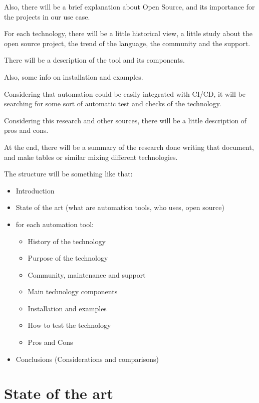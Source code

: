 \documentclass[12pt,a4paper,openright,twoside]{book}
\begin{document}
Also, there will be a brief explanation about Open Source, and its importance for the projects in our use case.


For each technology, there will be a little historical view, a little study about the open source project, the trend of the language, the community and the support.


There will be a description of the tool and its components.


Also, some info on installation and examples.


Considering that automation could be easily integrated with CI/CD, it will be searching for some sort of automatic test and checks of the technology.


Considering this research and other sources, there will be a little description of pros and cons.


At the end, there will be a summary of the research done writing that document, and make tables or similar mixing different technologies.

The structure will be something like that:

\begin{itemize}
    \item Introduction
    \item State of the art (what are automation tools, who uses, open source)
    \item for each automation tool:
    \begin{itemize}
    \item History of the technology
    \item Purpose of the technology
    \item Community, maintenance and support
    \item Main technology components
    \item Installation and examples
    \item How to test the technology
    \item Pros and Cons
    \end{itemize}
    \item Conclusions (Considerations and comparisons)
\end{itemize}



\chapter{State of the art}
\end{document}
